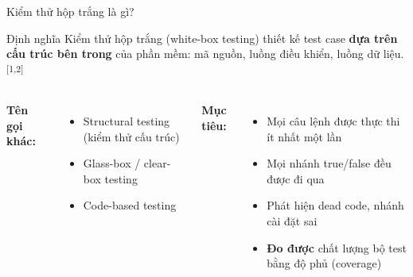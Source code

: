 \documentclass[aspectratio=169,12pt]{beamer}
\newcommand{\sref}[1]{\textsuperscript{\scriptsize[#1]}}
\begin{document}
\begin{frame}[shrink=8]{Kiểm thử hộp trắng là gì?}
  \begin{block}{Định nghĩa}
    Kiểm thử hộp trắng (white-box testing) thiết kế test case
    \textbf{dựa trên cấu trúc bên trong} của phần mềm: mã nguồn,
    luồng điều khiển, luồng dữ liệu.\sref{1,2}
  \end{block}

  \vspace{0.3em}
  \begin{columns}
    \textbf{Tên gọi khác:}
    \begin{itemize}
      \item Structural testing (kiểm thử cấu trúc)
      \item Glass-box / clear-box testing
      \item Code-based testing
    \end{itemize}

    \textbf{Mục tiêu:}
    \begin{itemize}
      \item Mọi câu lệnh được thực thi ít nhất một lần
      \item Mọi nhánh true/false đều được đi qua
      \item Phát hiện dead code, nhánh cài đặt sai
      \item \textbf{Đo được} chất lượng bộ test bằng độ phủ (coverage)
    \end{itemize}
  \end{columns}
\end{frame}
\end{document}
